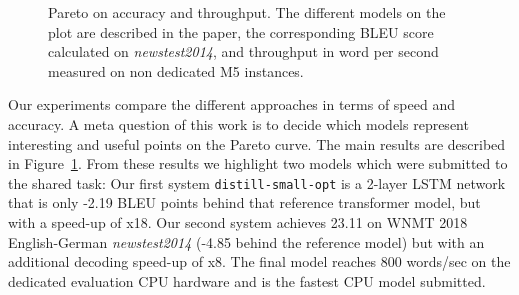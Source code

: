 \documentclass[11pt,a4paper]{article}
\begin{document}
\begin{figure}
\caption{Pareto on accuracy and throughput. The different models on the plot are described in the paper, the corresponding BLEU score calculated on {\it newstest2014}, and throughput in word per second measured on non dedicated M5 instances.}
\label{fig:pareto}
\end{figure}

Our experiments compare the different approaches in terms of speed and
accuracy. A meta question of this work is to decide which models
represent interesting and useful points on the Pareto curve. The main
results are described in Figure~\ref{fig:pareto}.  From these results
we highlight two models which were submitted to the shared task: Our
first system {\tt distill-small-opt} is a 2-layer LSTM network that is only
-2.19 BLEU points behind that reference transformer model, but with a
speed-up of {x18}. Our second system achieves 23.11 on
WNMT 2018 English-German {\it newstest2014} (-4.85 behind the reference
model) but with an additional decoding speed-up of {x8}.
The final model reaches 800 words/sec on the dedicated evaluation CPU hardware and is the fastest CPU model submitted.

\end{document}
